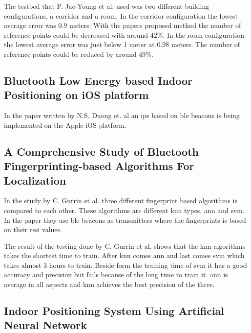 \bigskip

The testbed that P. Jae-Young et al. used was two different building configurations, a corridor and a room.
In the corridor configuration the lowest average error was $0.9$ meters. 
With the papers proposed method the number of reference points could be decreased with around $42\%$.
In the room configuration the lowest average error was just below 1 meter at $0.98$ meters.
The number of reference points could be reduced by around $49\%$.

\subsection{Bluetooth Low Energy based Indoor Positioning on iOS platform}\label{sec:}
In the paper \cite{BluetoothLowEnergy2018} written by N.S. Duong et. al an \acrshort{ips} based on \acrshort{ble} beacons is being implemented on the Apple iOS platform.


\subsection{A Comprehensive Study of Bluetooth Fingerprinting-based Algorithms For 
Localization}\label{sec:}
In the study \cite{ComprehensiveStudyBluetooth2013} by C. Gurrin et al. three different fingerprint based algorithms is compared to each other.
These algorithms are different \acrshort{knn} types, \acrfull{ann} and \acrfull{svm}.
In the paper they use \acrshort{ble} beacons as transmitters where the fingerprints is based on their \acrshort{rssi} values.

\bigskip

The result of the testing done by C. Gurrin et al. shows that the \acrshort{knn} algorithms takes the shortest time to train.
After \acrshort{knn} comes \acrshort{ann} and last comes \acrshort{svm}  which takes almost 3 hours to train.
Beside form the training time of \acrshort{svm}  it has a good accuracy and precision but fails because of the long time to train it.  \acrshort{ann} is average in all aspects and \acrshort{knn} achieves the best precision of the three.

\subsection{Indoor Positioning System Using Artificial Neural Network}\label{sec:}

